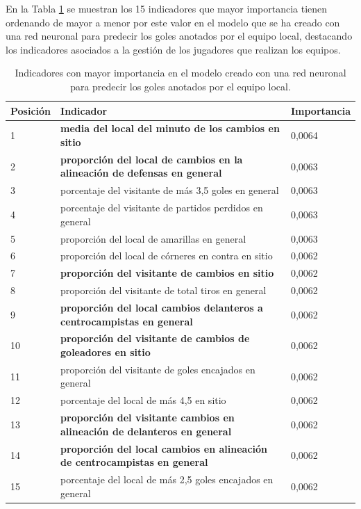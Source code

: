     


En la Tabla \ref{table:importancia-indicadores-local} se muestran los 15 indicadores que mayor importancia tienen ordenando de mayor a menor por este valor en el modelo que se ha creado con una red neuronal para predecir los goles anotados por el equipo local, destacando los indicadores asociados a la gestión de los jugadores que realizan los equipos.


\begin{table}[]
    \begin{tabularx}{\textwidth}{|l|>{\raggedright\arraybackslash}X|l|}
    \hline
    \rowcolor[HTML]{C0C0C0} 
    Posición & Indicador & Importancia \\ \hline
    1        &   \textbf{media del local del minuto de los cambios en sitio}&	0,0064        \\ \hline
    2        &      \textbf{proporción del local de cambios en la alineación de defensas en general}&	0,0063         \\ \hline
    3        &    porcentaje del visitante de más 3,5 goles en general&	0,0063         \\ \hline
    4        &    porcentaje del visitante de partidos perdidos en general&	0,0063      \\ \hline
    5        &     proporción del local de amarillas en general&	0,0063        \\ \hline
    6        &    proporción del local de córneres en contra en sitio&	0,0062         \\ \hline
    7        &    \textbf{proporción del visitante de cambios en sitio}&	0,0062         \\ \hline
    8        &    proporción del visitante de total tiros en general&	0,0062     \\ \hline
    9        &   \textbf{proporción del local cambios delanteros a centrocampistas en general}&	0,0062        \\ \hline
    10        &   \textbf{proporción del visitante de cambios de goleadores en sitio}&	0,0062       \\ \hline
    11       &     proporción del visitante de goles encajados en general&	0,0062       \\ \hline
    12       &    porcentaje del local de más 4,5 en sitio&	0,0062        \\ \hline
    13       &     \textbf{proporción del visitante cambios en alineación de delanteros en general}&	0,0062         \\ \hline
    14       &    \textbf{proporción del local cambios en alineación de centrocampistas en general}&	0,0062      \\ \hline
    15       &     porcentaje del local de más 2,5 goles encajados en general&	0,0062      \\ \hline

    \end{tabularx}
    \caption{Indicadores con mayor importancia en el modelo creado con una red neuronal para predecir los goles anotados por el equipo local.}
    \label{table:importancia-indicadores-local}
    \end{table}
    
